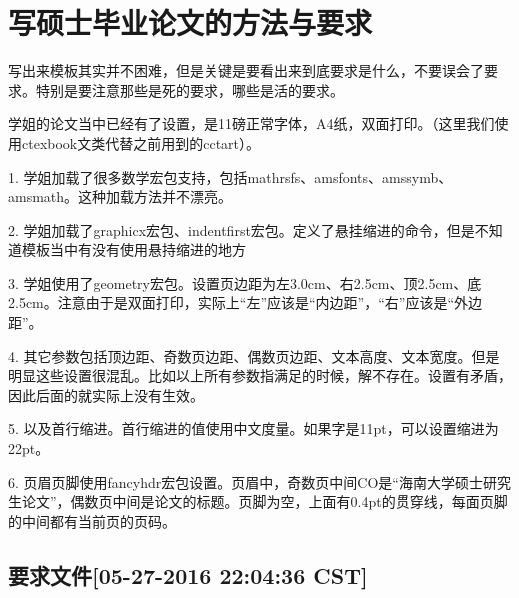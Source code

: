 \documentclass{hnuthesis}%
\begin{document}
\TitlePage

\EnglishTitlePage

\Declarations


\begin{ChineseAbstract}
    \lipsum[1-2]
\end{ChineseAbstract}

\begin{EnglishAbstract}
    \lipsum[1-2]
\end{EnglishAbstract}

\TableOfContents
{}\chapter{写硕士毕业论文的方法与要求}

写出来模板其实并不困难，但是关键是要看出来到底要求是什么，不要误会了要求。特别是要注意那些是死的要求，哪些是活的要求。

学姐的论文当中已经有了设置，是11磅正常字体，A4纸，双面打印。（这里我们使用ctexbook文类代替之前用到的cctart）。

1. 学姐加载了很多数学宏包支持，包括mathrsfs、amsfonts、amssymb、amsmath。这种加载方法并不漂亮。

2. 学姐加载了graphicx宏包、indentfirst宏包。定义了悬挂缩进的命令\TC{\hangindent}，但是不知道模板当中有没有使用悬持缩进的地方

3. 学姐使用了geometry宏包。设置页边距为左3.0cm、右2.5cm、顶2.5cm、底2.5cm。注意由于是双面打印，实际上“左”应该是“内边距”，“右”应该是“外边距”。

4. 其它参数包括\TC{\headsep 0.5cm}顶边距\TC{\topmargin 0pt}、奇数页边距\TC{\oddsidemargin 0pt}、偶数页边距\TC{\evensidemargin 0pt}、文本高度、文本宽度。但是明显这些设置很混乱。比如以上所有参数指满足的时候，解不存在。设置有矛盾，因此后面的就实际上没有生效。

5.  以及首行缩进\TC{\parindent 2\ccwd}。首行缩进的值使用中文度量。如果字是11pt，可以设置缩进为22pt。

6.  页眉页脚使用fancyhdr宏包设置。页眉中，奇数页中间CO是“海南大学硕士研究生论文”，偶数页中间是论文的标题。页脚为空，上面有0.4pt的贯穿线，每面页脚的中间都有当前页的页码。



\section{要求文件[05-27-2016 22:04:36 CST]}
\end{document}

